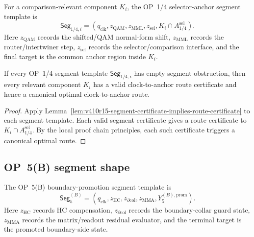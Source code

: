 \begin{definition}
\label{def:v410r15-op14-selector-anchor-segment-template}
For a comparison-relevant component \(K_i\), the OP~1/4 selector-anchor
segment template is
\[
 \mathsf{Seg}_{1/4,i}
 =
 (q_{\mathrm{clk}},
 z_{\mathrm{QAM}},
 z_{\mathrm{MML}},
 z_{\mathrm{sel}},
 K_i\cap A_{1/4}^{\mathrm{sel}}).
\]
Here \(z_{\mathrm{QAM}}\) records the shifted/QAM normal-form shift,
\(z_{\mathrm{MML}}\) records the router/intertwiner step,
\(z_{\mathrm{sel}}\) records the selector/comparison interface, and the final
target is the common anchor region inside \(K_i\).
\end{definition}

\begin{proposition}
\label{prop:v410r15-op14-segment-criterion}
If every OP~1/4 segment template \(\mathsf{Seg}_{1/4,i}\) has empty segment
obstruction, then every relevant component \(K_i\) has a valid clock-to-anchor
route certificate and hence a canonical optimal clock-to-anchor route.
\end{proposition}

\begin{proof}
Apply Lemma~\ref{lem:v410r15-segment-certificate-implies-route-certificate} to
each segment template. Each valid segment certificate gives a route
certificate to \(K_i\cap A_{1/4}^{\mathrm{sel}}\). By the local proof chain
principles, each such certificate triggers a canonical optimal route.
\end{proof}

\subsection{OP~5(B) segment shape}
\label{subsec:v410r15-op5b-segment-shape}

\begin{definition}
\label{def:v410r15-op5b-boundary-promotion-segment-template}
The OP~5(B) boundary-promotion segment template is
\[
 \mathsf{Seg}_{5}^{(B)}
 =
 (q_{\mathrm{clk}},
 z_{\mathrm{HC}},
 z_{\partial\mathrm{col}},
 z_{\mathrm{MMA}},
 Y_5^{(B),\mathrm{prom}}).
\]
Here \(z_{\mathrm{HC}}\) records HC compensation,
\(z_{\partial\mathrm{col}}\) records the boundary-collar guard state,
\(z_{\mathrm{MMA}}\) records the matrix/readout residual evaluator, and the
terminal target is the promoted boundary-side state.
\end{definition}

